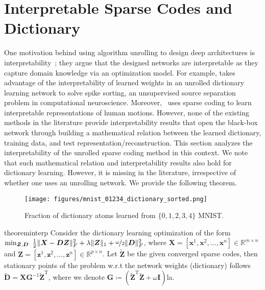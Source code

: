 \documentclass[10pt]{article} %
\newcommand{\R}{\mathbb{R}} %
\newcommand{\D}{{\bm D}}
\newcommand{\Z}{{\bm Z}}
\newcommand{\Xx}{{\bm X}}
\newcommand{\G}{{\bm G}}
\newcommand{\eye}{{\bm I}}
\newcommand{\x}{{\bm x}}
\newcommand{\z}{{\bm z}}
\begin{document}
%
\section{Interpretable Sparse Codes and Dictionary}
%
One motivation behind using algorithm unrolling to design deep architectures is interpretability~\citep{monga2019algorithm}; they argue that the designed networks are interpretable as they capture domain knowledge via an optimization model. For example, \citet{tolooshams2020tnnls} takes advantage of the interpretability of learned weights in an unrolled dictionary learning network to solve spike sorting, an unsupervised source separation problem in computational neuroscience. Moreover,~\citet{kim2010intersparsecodingvision} uses sparse coding to learn interpretable representations of human motions. However, none of the existing methods in the literature provide interpretability results that open the black-box network through building a mathematical relation between the learned dictionary, training data, and test representation/reconstruction. This section analyzes the interpretability of the unrolled sparse coding method in this context. We note that such mathematical relation and interpretability results also hold for dictionary learning. However, it is missing in the literature, irrespective of whether one uses an unrolling network. We provide the following theorem.
%
%
\begin{wrapfigure}[16]{r}{0.35\linewidth}
  \centering
  \texttt{[image: figures/mnist\_01234\_dictionary\_sorted.png]}
  \caption{Fraction of dictionary atoms learned from $\{0, 1, 2, 3, 4\}$ MNIST.}
  \label{fig:mnist_dict}
  \end{wrapfigure}
%
\begin{restatable}{theorem}{interp}\label{thm:interp}
Consider the dictionary learning optimization of the form $\min_{\Z, \D}\ \frac{1}{2} \| \Xx - \D \Z \|_{F}^2 + \lambda \| \Z \|_1 + \nicefrac{\omega}{2} \| \D \|_F^2$, where $\Xx = [\x^1, \x^2, \ldots, \x^n] \in \R^{m \times n}$ and $\Z = [\z^1, \z^2, \ldots, \z^n] \in \R^{p \times n}$. Let $\tilde \Z$ be the given converged sparse codes, then stationary points of the problem w.r.t the network weights (dictionary) follows $\tilde \D = \Xx \G^{-1} \tilde \Z^{\text{T}}$, where we denote $\G \coloneqq (\tilde \Z^{\text{T}} \tilde \Z + \omega \eye)$la.
\end{restatable}
%
\end{document}
